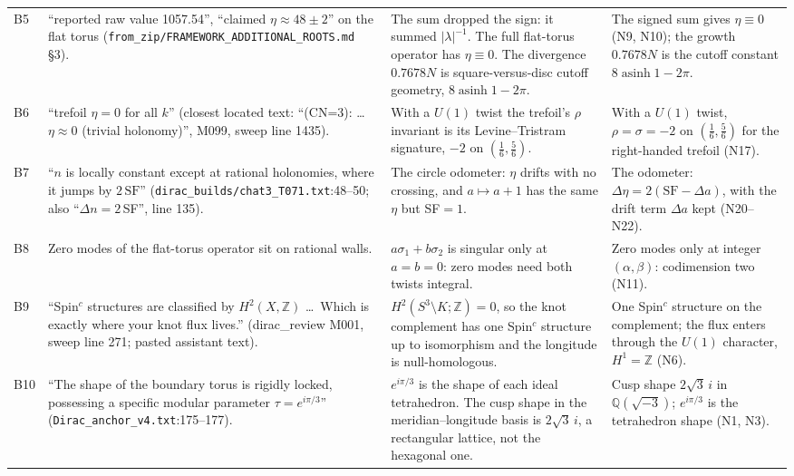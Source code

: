 \documentclass[11pt]{article}
\theoremstyle{definition}
\begin{document}
\begin{longtable}{@{}L{0.06\textwidth}L{0.34\textwidth}L{0.25\textwidth}L{0.25\textwidth}@{}}
B5 & ``reported raw value 1057.54'', ``claimed $\eta\approx48\pm2$'' on the flat torus (\texttt{from\_\allowbreak{}zip/FRAMEWORK\_\allowbreak{}ADDITIONAL\_\allowbreak{}ROOTS.md} \S3). & The sum dropped the sign: it summed $|\lambda|^{-1}$. The full flat-torus operator has $\eta\equiv0$. The divergence $0.7678N$ is square-versus-disc cutoff geometry, $8\operatorname{asinh}1-2\pi$. & The signed sum gives $\eta\equiv0$ (N9, N10); the growth $0.7678N$ is the cutoff constant $8\operatorname{asinh}1-2\pi$.\\
B6 & ``trefoil $\eta=0$ for all $k$'' (closest located text: ``(CN=3): \dots $\eta\approx0$ (trivial holonomy)'', M099, sweep line 1435). & With a $U(1)$ twist the trefoil's $\rho$ invariant is its Levine--Tristram signature, $-2$ on $(\tfrac16,\tfrac56)$. & With a $U(1)$ twist, $\rho=\sigma=-2$ on $(\tfrac16,\tfrac56)$ for the right-handed trefoil (N17).\\
B7 & ``$n$ is locally constant except at rational holonomies, where it jumps by $2\,\mathrm{SF}$'' (\texttt{dirac\_\allowbreak{}builds/chat3\_\allowbreak{}T071.txt}:48--50; also ``$\Delta n=2\,$SF'', line 135). & The circle odometer: $\eta$ drifts with no crossing, and $a\mapsto a+1$ has the same $\eta$ but SF$=1$. & The odometer: $\Delta\eta=2(\mathrm{SF}-\Delta a)$, with the drift term $\Delta a$ kept (N20--N22).\\
B8 & Zero modes of the flat-torus operator sit on rational walls. & $a\sigma_1+b\sigma_2$ is singular only at $a=b=0$: zero modes need both twists integral. & Zero modes only at integer $(\alpha,\beta)$: codimension two (N11).\\
B9 & ``Spin$^c$ structures are classified by $H^2(X,\mathbb Z)$ \dots\ Which is exactly where your knot flux lives.'' (dirac\_\allowbreak{}review M001, sweep line 271; pasted assistant text). & $H^2(S^3\setminus K;\mathbb Z)=0$, so the knot complement has one Spin$^c$ structure up to isomorphism and the longitude is null-homologous. & One Spin$^c$ structure on the complement; the flux enters through the $U(1)$ character, $H^1=\mathbb Z$ (N6).\\
B10 & ``The shape of the boundary torus is rigidly locked, possessing a specific modular parameter $\tau=e^{i\pi/3}$'' (\texttt{Dirac\_\allowbreak{}anchor\_\allowbreak{}v4.txt}:175--177). & $e^{i\pi/3}$ is the shape of each ideal tetrahedron. The cusp shape in the meridian--longitude basis is $2\sqrt3\,i$, a rectangular lattice, not the hexagonal one. & Cusp shape $2\sqrt3\,i$ in $\mathbb Q(\sqrt{-3})$; $e^{i\pi/3}$ is the tetrahedron shape (N1, N3).\\

\end{longtable}
\end{document}
